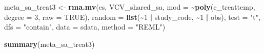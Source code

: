 \documentclass[
]{article}
\newenvironment{Shaded}{\begin{snugshade}}{\end{snugshade}}
\newcommand{\AttributeTok}[1]{\textcolor[rgb]{0.13,0.29,0.53}{#1}}
\newcommand{\CommentTok}[1]{\textcolor[rgb]{0.56,0.35,0.01}{\textit{#1}}}
\newcommand{\ConstantTok}[1]{\textcolor[rgb]{0.56,0.35,0.01}{#1}}
\newcommand{\DecValTok}[1]{\textcolor[rgb]{0.00,0.00,0.81}{#1}}
\newcommand{\FloatTok}[1]{\textcolor[rgb]{0.00,0.00,0.81}{#1}}
\newcommand{\FunctionTok}[1]{\textcolor[rgb]{0.13,0.29,0.53}{\textbf{#1}}}
\newcommand{\NormalTok}[1]{#1}
\newcommand{\OtherTok}[1]{\textcolor[rgb]{0.56,0.35,0.01}{#1}}
\newcommand{\SpecialCharTok}[1]{\textcolor[rgb]{0.81,0.36,0.00}{\textbf{#1}}}
\newcommand{\StringTok}[1]{\textcolor[rgb]{0.31,0.60,0.02}{#1}}
\begin{document}
\begin{Shaded}
\end{Shaded}

\begin{Shaded}
\begin{Highlighting}[]
\NormalTok{meta\_sa\_treat3 }\OtherTok{\textless{}{-}} \FunctionTok{rma.mv}\NormalTok{(es, VCV\_shared\_sa, }\AttributeTok{mod =} \SpecialCharTok{\textasciitilde{}}\FunctionTok{poly}\NormalTok{(c\_treattemp,}
    \AttributeTok{degree =} \DecValTok{3}\NormalTok{, }\AttributeTok{raw =} \ConstantTok{TRUE}\NormalTok{), }\AttributeTok{random =} \FunctionTok{list}\NormalTok{(}\SpecialCharTok{\textasciitilde{}}\DecValTok{1} \SpecialCharTok{|}\NormalTok{ study\_code, }\SpecialCharTok{\textasciitilde{}}\DecValTok{1} \SpecialCharTok{|}
\NormalTok{    obs), }\AttributeTok{test =} \StringTok{"t"}\NormalTok{, }\AttributeTok{dfs =} \StringTok{"contain"}\NormalTok{, }\AttributeTok{data =}\NormalTok{ sdata, }\AttributeTok{method =} \StringTok{"REML"}\NormalTok{)}
\end{Highlighting}
\end{Shaded}

\begin{Shaded}
\begin{Highlighting}[]
\FunctionTok{summary}\NormalTok{(meta\_sa\_treat3)}
\end{Highlighting}
\end{Shaded}
\end{document}

